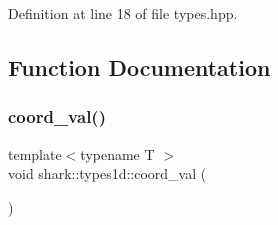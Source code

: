 Definition at line 18 of file types.\+hpp.



\subsection{Function Documentation}
\hypertarget{namespaceshark_1_1types1d_a42d73f6e183ef96608e9fc641d3ad942}{}\label{namespaceshark_1_1types1d_a42d73f6e183ef96608e9fc641d3ad942} 
\subsubsection{\texorpdfstring{coord\+\_\+val()}{coord\_val()}}
{\footnotesize\ttfamily template$<$typename T $>$ \\
void shark\+::types1d\+::coord\+\_\+val (\begin{DoxyParamCaption}{ }\end{DoxyParamCaption})}

